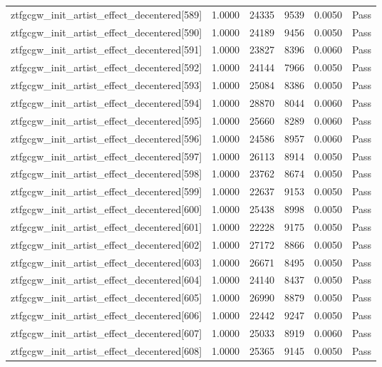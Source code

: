 \begin{table}[htbp]
\begin{tabular}{llrrll}
ztfgcgw\_init\_artist\_effect\_decentered[589] & 1.0000 & 24335 & 9539 & 0.0050 & Pass \\
ztfgcgw\_init\_artist\_effect\_decentered[590] & 1.0000 & 24189 & 9456 & 0.0050 & Pass \\
ztfgcgw\_init\_artist\_effect\_decentered[591] & 1.0000 & 23827 & 8396 & 0.0060 & Pass \\
ztfgcgw\_init\_artist\_effect\_decentered[592] & 1.0000 & 24144 & 7966 & 0.0050 & Pass \\
ztfgcgw\_init\_artist\_effect\_decentered[593] & 1.0000 & 25084 & 8386 & 0.0050 & Pass \\
ztfgcgw\_init\_artist\_effect\_decentered[594] & 1.0000 & 28870 & 8044 & 0.0060 & Pass \\
ztfgcgw\_init\_artist\_effect\_decentered[595] & 1.0000 & 25660 & 8289 & 0.0060 & Pass \\
ztfgcgw\_init\_artist\_effect\_decentered[596] & 1.0000 & 24586 & 8957 & 0.0060 & Pass \\
ztfgcgw\_init\_artist\_effect\_decentered[597] & 1.0000 & 26113 & 8914 & 0.0050 & Pass \\
ztfgcgw\_init\_artist\_effect\_decentered[598] & 1.0000 & 23762 & 8674 & 0.0050 & Pass \\
ztfgcgw\_init\_artist\_effect\_decentered[599] & 1.0000 & 22637 & 9153 & 0.0050 & Pass \\
ztfgcgw\_init\_artist\_effect\_decentered[600] & 1.0000 & 25438 & 8998 & 0.0050 & Pass \\
ztfgcgw\_init\_artist\_effect\_decentered[601] & 1.0000 & 22228 & 9175 & 0.0050 & Pass \\
ztfgcgw\_init\_artist\_effect\_decentered[602] & 1.0000 & 27172 & 8866 & 0.0050 & Pass \\
ztfgcgw\_init\_artist\_effect\_decentered[603] & 1.0000 & 26671 & 8495 & 0.0050 & Pass \\
ztfgcgw\_init\_artist\_effect\_decentered[604] & 1.0000 & 24140 & 8437 & 0.0050 & Pass \\
ztfgcgw\_init\_artist\_effect\_decentered[605] & 1.0000 & 26990 & 8879 & 0.0050 & Pass \\
ztfgcgw\_init\_artist\_effect\_decentered[606] & 1.0000 & 22442 & 9247 & 0.0050 & Pass \\
ztfgcgw\_init\_artist\_effect\_decentered[607] & 1.0000 & 25033 & 8919 & 0.0060 & Pass \\
ztfgcgw\_init\_artist\_effect\_decentered[608] & 1.0000 & 25365 & 9145 & 0.0050 & Pass \\

\end{tabular}
\end{table}
